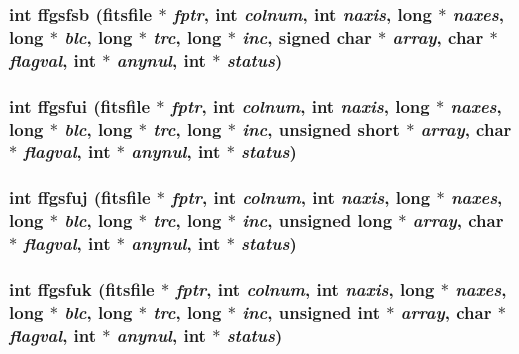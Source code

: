 \subsubsection{\setlength{\rightskip}{0pt plus 5cm}int ffgsfsb (\bf{fitsfile} $\ast$ {\em fptr}, int {\em colnum}, int {\em naxis}, long $\ast$ {\em naxes}, long $\ast$ {\em blc}, long $\ast$ {\em trc}, long $\ast$ {\em inc}, signed char $\ast$ {\em array}, char $\ast$ {\em flagval}, int $\ast$ {\em anynul}, int $\ast$ {\em status})}\label{fitsio_8h_e824866f99503c243fed85e3cce3aaf4}


\subsubsection{\setlength{\rightskip}{0pt plus 5cm}int ffgsfui (\bf{fitsfile} $\ast$ {\em fptr}, int {\em colnum}, int {\em naxis}, long $\ast$ {\em naxes}, long $\ast$ {\em blc}, long $\ast$ {\em trc}, long $\ast$ {\em inc}, unsigned short $\ast$ {\em array}, char $\ast$ {\em flagval}, int $\ast$ {\em anynul}, int $\ast$ {\em status})}\label{fitsio_8h_c591c8ea9be72a7c242e8f102f6ba3b4}


\subsubsection{\setlength{\rightskip}{0pt plus 5cm}int ffgsfuj (\bf{fitsfile} $\ast$ {\em fptr}, int {\em colnum}, int {\em naxis}, long $\ast$ {\em naxes}, long $\ast$ {\em blc}, long $\ast$ {\em trc}, long $\ast$ {\em inc}, unsigned long $\ast$ {\em array}, char $\ast$ {\em flagval}, int $\ast$ {\em anynul}, int $\ast$ {\em status})}\label{fitsio_8h_60eb38f1f62e5060ffca964466dd248e}


\subsubsection{\setlength{\rightskip}{0pt plus 5cm}int ffgsfuk (\bf{fitsfile} $\ast$ {\em fptr}, int {\em colnum}, int {\em naxis}, long $\ast$ {\em naxes}, long $\ast$ {\em blc}, long $\ast$ {\em trc}, long $\ast$ {\em inc}, unsigned int $\ast$ {\em array}, char $\ast$ {\em flagval}, int $\ast$ {\em anynul}, int $\ast$ {\em status})}\label{fitsio_8h_8c55ce0c3ac249a3b00043f7872099f4}


